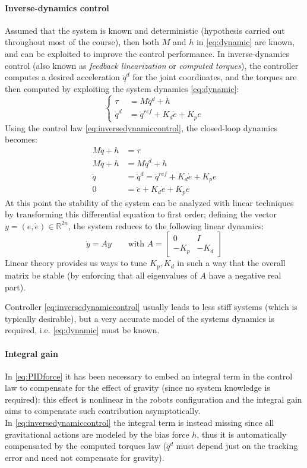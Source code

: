	\paragraph{Inverse-dynamics control} Assumed that the system is known and deterministic (hypothesis carried out throughout most of the course), then both $M$ and $h$ in \eqref{eq:dynamic} are known, and can be exploited to improve the control performance. In inverse-dynamics control (also known as \textit{feedback linearization} or \textit{computed torques}), the controller computes a desired acceleration $\ddot q^d$ for the joint coordinates, and the torques are then computed by exploiting the system dynamics \eqref{eq:dynamic}:
	\begin{equation} \label{eq:inversedynamiccontrol}
	\begin{cases}
		\tau & = M \ddot q^d + h \\ 
		\ddot q^d &= \ddot q^{ref} + K_d \dot e + K_p e
	\end{cases}
	\end{equation}
	Using the control law \eqref{eq:inversedynamiccontrol}, the closed-loop dynamics becomes:
	\begin{align*}
		M \ddot q + h & = \tau \\ 
		M \ddot q + h & = M\ddot q^d + h \\
		\ddot q & = \ddot q^d = \ddot q^{ref} + K_d\dot e + K_p e \\
		0 & = \ddot e + K_d\dot e + K_p e
	\end{align*}
	At this point the stability of the system can be analyzed with linear techniques by transforming this differential equation to first order; defining the vector $y = (e,\dot e) \in \mathds R^{2n}$, the system reduces to the following linear dynamics:
	\[ \dot y = A y \qquad \textrm{with } A  = \begin{bmatrix}
		0 & I \\ -K_p & -K_d
	\end{bmatrix}\]
	Linear theory provides us ways to tune $K_p, K_d$ in such a way that the overall matrix be stable (by enforcing that all eigenvalues of $A$ have a negative real part).
	
	Controller \eqref{eq:inversedynamiccontrol} usually leads to less stiff systems (which is typically desirable), but a very accurate model of the systems dynamics is required, i.e. \eqref{eq:dynamic} must be known.
	
	\paragraph{Integral gain} In \eqref{eq:PIDforce} it has been necessary to embed an integral term in the control law to compensate for the effect of gravity (since no system knowledge is required): this effect is nonlinear in the robots configuration and the integral gain aims to compensate such contribution asymptotically.\\
	In \eqref{eq:inversedynamiccontrol} the integral term is instead missing since all gravitational actions are modeled by the bias force $h$, thus it is automatically compensated by the computed torques law ($\ddot q^d$ must depend just on the tracking error and need not compensate for gravity).
	
